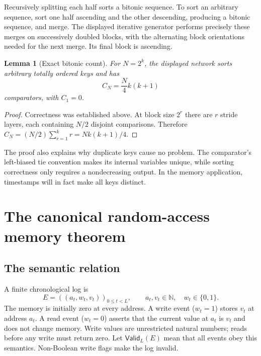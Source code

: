 \documentclass[11pt,a4paper]{article}
\newtheorem{lemma}[lemma]{Lemma}
\theoremstyle{definition}
\theoremstyle{remark}
\newcommand{\N}{\mathbb N}
\newcommand{\Valid}{\mathsf{Valid}}
\newcommand{\srctag}[1]{\texorpdfstring{\hspace{0.5em}{\normalfont\small\color{accent}[#1]}}{ [#1]}}
\begin{document}
Recursively splitting each half sorts a bitonic sequence. To sort an arbitrary
sequence, sort one half ascending and the other descending, producing a bitonic
sequence, and merge. The displayed iterative generator performs precisely
these merges on successively doubled blocks, with the alternating block
orientations needed for the next merge. Its final block is ascending.

\begin{lemma}[Exact bitonic count]\label{cdc:mem:lem:bitonic-count}
For $N=2^k$, the displayed network sorts arbitrary totally ordered keys and has
\begin{equation}\label{cdc:mem:eq:bitonic-count}
 C_N=\frac{N}{4}k(k+1)
\end{equation}
comparators, with $C_1=0$.
\end{lemma}
\begin{proof}
Correctness was established above. At block size $2^r$ there are $r$ stride
layers, each containing $N/2$ disjoint comparisons. Therefore
$C_N=(N/2)\sum_{r=1}^k r=Nk(k+1)/4$.
\end{proof}

The proof also explains why duplicate keys cause no problem. The comparator's
left-biased tie convention makes its internal variables unique, while sorting
correctness only requires a nondecreasing output. In the memory application,
timestamps will in fact make all keys distinct.

\section{The canonical random-access memory theorem\srctag{03}}\label{cdc:mem:sec:memory}
\subsection{The semantic relation}
A finite chronological log is
\begin{equation}\label{cdc:mem:eq:log}
 E=((a_t,w_t,v_t))_{0\leq t<L},\qquad
 a_t,v_t\in\N,\quad w_t\in\{0,1\}.
\end{equation}
The memory is initially zero at every address. A write event ($w_t=1$) stores
$v_t$ at address $a_t$. A read event ($w_t=0$) asserts that the current value at
$a_t$ is $v_t$ and does not change memory. Write values are unrestricted natural
numbers; reads before any write must return zero. Let $\Valid_L(E)$ mean that
all events obey this semantics. Non-Boolean write flags make the log invalid.
\end{document}
